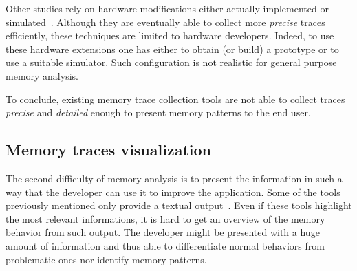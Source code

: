 Other studies rely on hardware modifications either actually implemented or simulated~\cite{Bao08HMTT,Martonosi92MemSpy}.
Although they are eventually able to collect more \emph{precise} traces efficiently, these techniques are limited to hardware developers.
Indeed, to use these hardware extensions one has either to obtain (or build) a prototype or to use a suitable simulator.
Such configuration is not realistic for general purpose memory analysis.

To conclude, existing memory trace collection tools are not able to collect traces \emph{precise} and \emph{detailed} enough to present memory patterns to the end user.

\subsection{Memory traces visualization}

The second difficulty of memory analysis is to present the information in such a way that the developer can use it to improve the application.
Some of the tools previously mentioned only provide a textual output~\cite{Lachaize12MemProf,McCurdy10Memphis,Martonosi92MemSpy}.
Even if these tools highlight the most relevant informations, it is hard to get an overview of the memory behavior from such output.
The developer might be presented with a huge amount of information and thus able to differentiate normal behaviors from problematic ones nor identify memory patterns.

